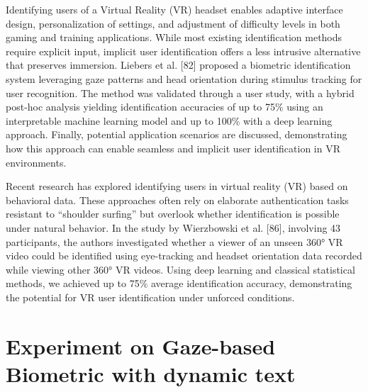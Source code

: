 \documentclass{article}
\begin{document}
Identifying users of a Virtual Reality (VR) headset enables adaptive interface design, personalization of settings, and adjustment of difficulty levels in both gaming and training applications.
While most existing identification methods require explicit input, implicit user identification offers a less intrusive alternative that preserves immersion.
Liebers et al. [82] proposed a biometric identification system leveraging gaze patterns and head orientation during stimulus tracking for user recognition.
The method was validated through a user study, with a hybrid post-hoc analysis yielding identification accuracies of up to 75\% using an interpretable machine learning model and up to 100\% with a deep learning approach.
Finally, potential application scenarios are discussed, demonstrating how this approach can enable seamless and implicit user identification in VR environments.

Recent research has explored identifying users in virtual reality (VR) based on behavioral data. 
These approaches often rely on elaborate authentication tasks resistant to “shoulder surfing” but overlook whether identification is possible under natural behavior.
In the study by Wierzbowski et al. [86], involving 43 participants, the authors investigated whether a viewer of an unseen 360° VR video could be identified using eye-tracking and headset orientation data recorded while viewing other 360° VR videos.
Using deep learning and classical statistical methods, we achieved up to 75\% average identification accuracy, demonstrating the potential for VR user identification under unforced conditions.
\newpage

\section{Experiment on Gaze-based Biometric with dynamic text}
\end{document}
